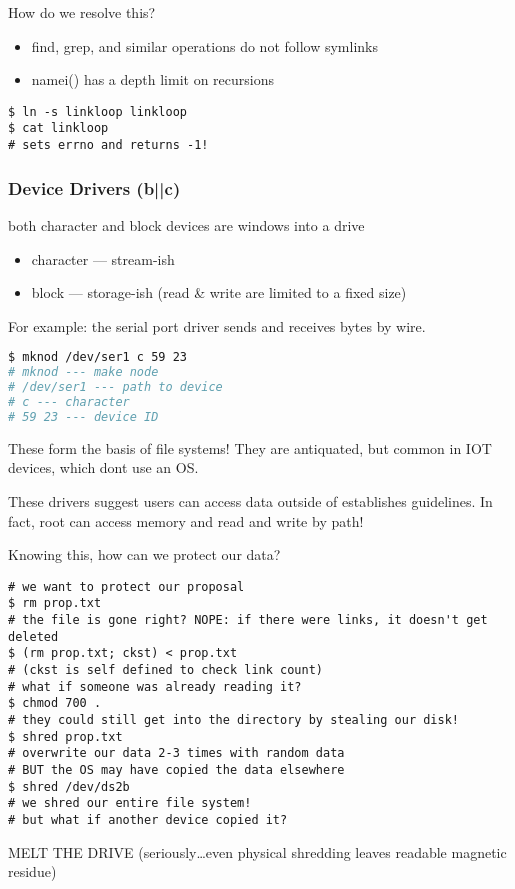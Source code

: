 \documentclass[../../lecture_notes.tex]{subfiles}
\begin{document}
How do we resolve this?
\begin{itemize}
\item find, grep, and similar operations do not follow symlinks
\item namei() has a depth limit on recursions
\end{itemize}
\begin{lstlisting}
$ ln -s linkloop linkloop
$ cat linkloop
# sets errno and returns -1!
\end{lstlisting}


\subsubsection*{Device Drivers (b||c)}
both character and block devices are windows into a drive
\begin{itemize}
	\item character --- stream-ish
	\item block --- storage-ish (read \& write are limited to a fixed size)
\end{itemize}
For example: the serial port driver sends and receives bytes by wire.
\begin{lstlisting}[language=sh]
$ mknod /dev/ser1 c 59 23
# mknod --- make node
# /dev/ser1 --- path to device
# c --- character
# 59 23 --- device ID
\end{lstlisting}

These form the basis of file systems! They are antiquated, but common in IOT devices, which dont use an OS.

These drivers suggest users can access data outside of establishes guidelines. In fact, root can access memory and read and write by path!

Knowing this, how can we protect our data?
\begin{lstlisting}
# we want to protect our proposal
$ rm prop.txt
# the file is gone right? NOPE: if there were links, it doesn't get deleted
$ (rm prop.txt; ckst) < prop.txt
# (ckst is self defined to check link count) 
# what if someone was already reading it?
$ chmod 700 .
# they could still get into the directory by stealing our disk!
$ shred prop.txt
# overwrite our data 2-3 times with random data
# BUT the OS may have copied the data elsewhere
$ shred /dev/ds2b
# we shred our entire file system!
# but what if another device copied it?
\end{lstlisting}
MELT THE DRIVE
(seriously…even physical shredding leaves readable magnetic residue)
\end{document}
